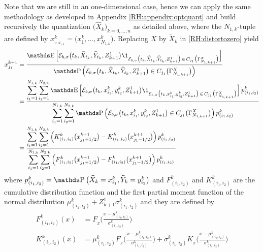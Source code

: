 Note that we are still in an one-dimensional case, hence we can apply the same methodology as developed in Appendix \ref{RH:appendix:optquant} and build recursively the quantization $\big( \widehat X_k \big)_{k = 0, \dots, n}$ as detailed above, where the $N_{1,k}$-tuple are defined by $x_{_{1:N_{1,k}}}^k = \big( x_1^k, \dots, x_{N_{1,k}}^k \big)$. Replacing $X$ by $\widetilde X_k$ in \eqref{RH:distortozero} yield
\begin{equation}
	\begin{aligned}
		x_{j_1}^{k+1}
		 & = \frac{ \E \Big[ \mathcal{E}_{b, \sigma} \big( t_k, \widehat X_{t_k}, \widehat Y_{t_k}, Z_{k+1}^1 \big) \1_{ \mathcal{E}_{b, \sigma} \big( t_k, \widehat X_{t_k}, \widehat Y_{t_k}, Z_{k+1}^1 \big) \, \in \, C_{j_1} \big( \Gamma_{N_{1,k+1}}^X \big) } \Big] }{\Prob \Big( \mathcal{E}_{b, \sigma} \big( t_k, \widehat X_{t_k}, \widehat Y_{t_k}, Z_{k+1}^1 \big) \in C_{j_1} \big( \Gamma_{N_{1,k+1}}^X \big) \Big) }                                                                                                                    \\
		 & = \frac{ \displaystyle \sum_{i_1=1}^{N_{1,k}} \sum_{i_2=1}^{N_{2,k}} \E \Big[ \mathcal{E}_{b, \sigma} \big( t_k, x_{i_1}^k, y_{i_2}^k, Z_{k+1}^1 \big) \1_{ \mathcal{E}_{b, \sigma} \big( t_k, x_{i_1}^k, y_{i_2}^k, Z_{k+1}^1 \big) \, \in \, C_{j_1} \big( \Gamma_{N_{1,k+1}}^X \big) } \Big] \, p_{(i_1,i_2)}^k}{ \displaystyle \sum_{i_1=1}^{N_{1,k}} \sum_{i_2=1}^{N_{2,k}} \Prob \Big( \mathcal{E}_{b, \sigma} \big( t_k, x_{i_1}^k, y_{i_2}^k, Z_{k+1}^1 \big) \in C_{j_1} \big( \Gamma_{N_{1,k+1}}^X \big) \Big) \, p_{(i_1,i_2)}^k} \\
		 & = \frac{ \displaystyle \sum_{i_1=1}^{N_{1,k}} \sum_{i_2=1}^{N_{2,k}} \Big( K_{(i_1,i_2)}^k \big( x_{j_1 + 1/2}^{k+1} \big) - K_{(i_1,i_2)}^k \big( x_{j_1 - 1/2}^{k+1} \big) \Big) \, p_{(i_1,i_2)}^k}{ \displaystyle \sum_{i_1=1}^{N_{1,k}} \sum_{i_2=1}^{N_{2,k}} \Big( F_{(i_1,i_2)}^k \big( x_{j_1 + 1/2}^{k+1} \big) - F_{(i_1,i_2)}^k \big( x_{j_1 - 1/2}^{k+1} \big) \Big) \, p_{(i_1,i_2)}^k}
	\end{aligned}
\end{equation}
where $p_{(i_1,i_2)}^k = \Prob \big( \widehat X_k = x_{i_1}^k, \widehat Y_k = y_{i_2}^k \big)$ and $F_{(i_1,i_2)}^k$ and $K_{(i_1,i_2)}^k$ are the cumulative distribution function and the first partial moment function of the normal distribution $\mu_{(i_1,i_2)}^k + Z_{k+1}^1 \sigma_{(i_1,i_2)}^k $ and they are defined by
\begin{equation}
	\begin{aligned}
		F_{(i_1,i_2)}^k ( x ) & = F_{_Z} \bigg( \frac{x - \mu_{(i_1,i_2)}^k }{\sigma_{(i_1,i_2)}^k} \bigg)                                                                                                                   \\
		K_{(i_1,i_2)}^k ( x ) & = \mu_{(i_1,i_2)}^k F_{_Z} \bigg( \frac{x - \mu_{(i_1,i_2)}^k }{\sigma_{(i_1,i_2)}^k} \bigg) + \sigma_{(i_1,i_2)}^k K_{_Z} \bigg( \frac{x - \mu_{(i_1,i_2)}^k }{\sigma_{(i_1,i_2)}^k} \bigg) \\
	\end{aligned}
\end{equation}
